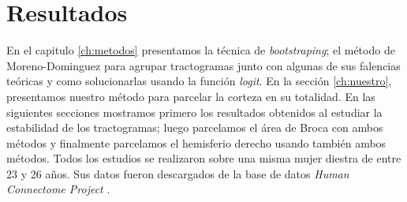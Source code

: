 \chapter{Resultados}
\label{ch:resultados}

En el capitulo \ref{ch:metodos} presentamos la t\'ecnica de 
\textit{bootstraping}; el m\'etodo de Moreno-Dominguez para agrupar
tractogramas junto con algunas de sus falencias te\'oricas y como
solucionarlas usando la funci\'on \textit{logit}. En la secci\'on 
\ref{ch:nuestro}, presentamos nuestro m\'etodo para parcelar la corteza en
su totalidad. En las siguientes secciones mostramos primero los resultados
obtenidos al estudiar la estabilidad de los tractogramas; luego parcelamos
el \'area de Broca con ambos m\'etodos y finalmente parcelamos el
hemisferio derecho usando tambi\'en ambos m\'etodos. Todos los estudios se
realizaron sobre una misma mujer diestra de entre 23 y 26 a\~nos. Sus datos
fueron descargados de la base de datos \textit{Human Connectome Project}
\cite{VanEssen2012}. \\









